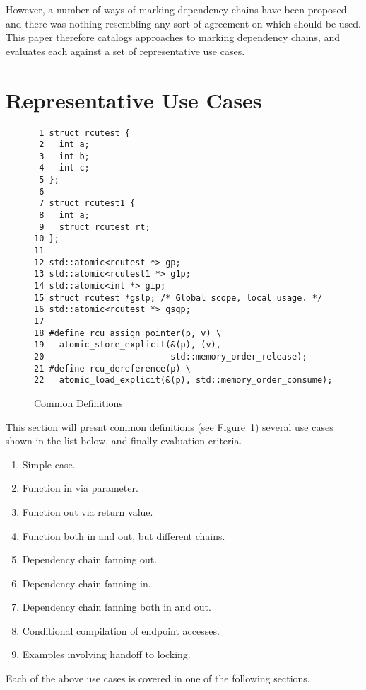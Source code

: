 \documentclass[letterpaper,twocolumn,10pt]{article}
\begin{document}
However, a number of ways of marking dependency chains have been
proposed and there was nothing resembling any sort of agreement
on which should be used.
This paper therefore catalogs approaches to marking dependency chains,
and evaluates each against a set of representative use cases.

\section{Representative Use Cases}
\label{sec:Representative Use Cases}

\begin{figure}[tbp]
{ \scriptsize
\begin{verbatim}
 1 struct rcutest {
 2   int a;
 3   int b;
 4   int c;
 5 };
 6
 7 struct rcutest1 {
 8   int a;
 9   struct rcutest rt;
10 };
11
12 std::atomic<rcutest *> gp;
13 std::atomic<rcutest1 *> g1p;
14 std::atomic<int *> gip;
15 struct rcutest *gslp; /* Global scope, local usage. */
16 std::atomic<rcutest *> gsgp;
17
18 #define rcu_assign_pointer(p, v) \
19   atomic_store_explicit(&(p), (v),
20                         std::memory_order_release);
21 #define rcu_dereference(p) \
22   atomic_load_explicit(&(p), std::memory_order_consume);
\end{verbatim}
}
\caption{Common Definitions}
\label{fig:Common Definitions}
\end{figure}

This section will presnt common definitions (see
Figure~\ref{fig:Common Definitions})
several use cases shown in the list below,
and finally evaluation criteria.

\begin{enumerate}
\item	Simple case.
\item	Function in via parameter.
\item	Function out via return value.
\item	Function both in and out, but different chains.
\item	Dependency chain fanning out.
\item	Dependency chain fanning in.
\item	Dependency chain fanning both in and out.
\item	Conditional compilation of endpoint accesses.
\item	Examples involving handoff to locking.
\end{enumerate}

Each of the above use cases is covered in one of the following sections.
\end{document}
